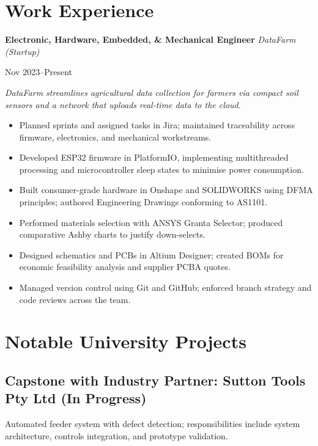 \documentclass[11pt,a4paper]{article}
\begin{document}
\section{Work Experience}
\textbf{Electronic, Hardware, Embedded, \& Mechanical Engineer} \textbar{} \textit{DataFarm (Startup)} \hfill
\vspace{-8pt} %
\begin{flushright}
    {Nov 2023--Present}
\end{flushright}
\vspace{-8pt} %
\textit{DataFarm streamlines agricultural data collection for farmers via compact soil sensors and a network that uploads real-time data to the cloud.}
\begin{itemize}
    \item Planned sprints and assigned tasks in Jira; maintained traceability across firmware, electronics, and mechanical workstreams.
    \item Developed ESP32 firmware in PlatformIO, implementing multithreaded processing and microcontroller sleep states to minimise power consumption.
    \item Built consumer-grade hardware in Onshape and SOLIDWORKS using DFMA principles; authored Engineering Drawings conforming to AS1101.
    \item Performed materials selection with ANSYS Granta Selector; produced comparative Ashby charts to justify down-selects.
    \item Designed schematics and PCBs in Altium Designer; created BOMs for economic feasibility analysis and supplier PCBA quotes.
    \item Managed version control using Git and GitHub; enforced branch strategy and code reviews across the team.
\end{itemize}

\section{Notable University Projects}
\subsection{Capstone with Industry Partner: Sutton Tools Pty Ltd (In Progress)}
Automated feeder system with defect detection; responsibilities include system architecture, controls integration, and prototype validation.
\end{document}
